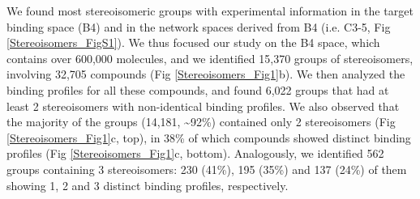 We found most stereoisomeric groups with experimental information in the target binding space (B4) and in the network spaces derived from B4 (i.e. C3-5, Fig \ref{Stereoisomers_FigS1}). We thus focused our study on the B4 space, which contains over 600,000 molecules, and we identified 15,370 groups of stereoisomers, involving 32,705 compounds (Fig \ref{Stereoisomers_Fig1}b). We then analyzed the binding profiles for all these compounds, and found 6,022 groups that had at least 2 stereoisomers with non-identical binding profiles. We also observed that the majority of the groups (14,181, \textasciitilde92\%) contained only 2 stereoisomers (Fig \ref{Stereoisomers_Fig1}c, top), in 38\% of which compounds showed distinct binding profiles (Fig \ref{Stereoisomers_Fig1}c, bottom). Analogously, we identified 562 groups containing 3 stereoisomers: 230 (41\%), 195 (35\%) and 137 (24\%) of them showing 1, 2 and 3 distinct binding profiles, respectively.

